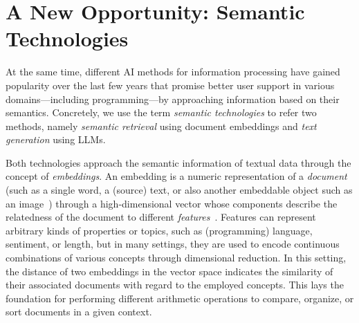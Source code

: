 
\section{A New Opportunity: Semantic Technologies}
\label{sec:background/semtec}

At the same time, different AI methods for information processing have gained popularity over the last few years that promise better user support in various domains---including programming---by approaching information based on their semantics.
Concretely, we use the term \emph{semantic technologies} to refer two methods, namely \emph{semantic retrieval} using document embeddings and \emph{text generation} using LLMs.

Both technologies approach the semantic information of textual data through the concept of \emph{embeddings}.
An embedding is a numeric representation of a \emph{document} (such as a single word, a (source) text, or also another embeddable object such as an image~\cite{dosovitskiy2021image}) through a high-dimensional vector whose components describe the relatedness of the document to different \emph{features}~\cite{mikolov2013efficient,devlin2019bert}.
Features can represent arbitrary kinds of properties or topics, such as (programming) language, sentiment, or length, but in many settings, they are used to encode continuous combinations of various concepts through dimensional reduction.
In this setting, the distance of two embeddings in the vector space indicates the similarity of their associated documents with regard to the employed concepts.
This lays the foundation for performing different arithmetic operations to compare, organize, or sort documents in a given context.

